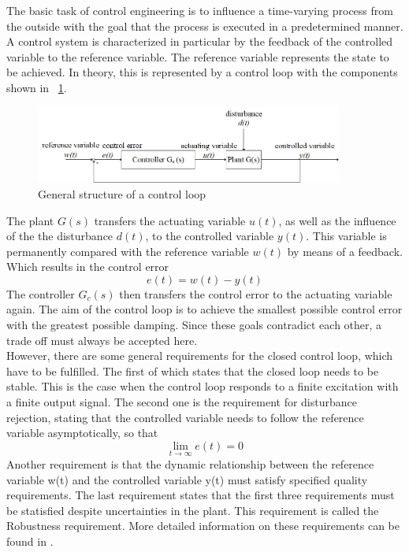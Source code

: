 The basic task of control engineering is to influence a time-varying process from the outside with the goal that the process is executed in a predetermined manner. A control system is characterized in particular by the feedback of the controlled variable to the reference variable. The reference variable represents the state to be achieved.
In theory, this is represented by a control loop with the components shown in \figurename~{\ref{fig:control_loop}}.
\begin{figure}
  \centering
  \includegraphics[width=0.9\textwidth]{images/control_loop.jpg}
  \caption[General structure of a control loop]{General structure of a control loop}
  \label{fig:control_loop}
\end{figure}
The plant $G(s)$ transfers the actuating variable $u(t)$, as well as the influence of the the disturbance $d(t)$, to the controlled variable $y(t)$. This variable is permanently compared with the reference variable $w(t)$ by means of a feedback. Which results in the control error
\begin{equation}
  e(t) = w(t) - y(t)
 \label{eq:e_t}
\end{equation}
The controller $G_{c}(s)$ then transfers the control error to the actuating variable again. The aim of the control loop is to achieve the smallest possible control error with the greatest possible damping. Since these goals contradict each other, a trade off must always be accepted here.\cite{Reg_17}
\\However, there are some general requirements for the closed control loop, which have to be fulfilled. The first of which states that the closed loop needs to be stable. This is the case when the control loop responds to a finite excitation with a finite output signal. The second one is the requirement for disturbance rejection, stating that the controlled variable needs to follow the reference variable asymptotically, so that
\begin{equation}
    \lim\limits_{t \rightarrow \infty}{e(t)} = 0
 \label{eq:lim_e}
\end{equation}
Another requirement is that the dynamic relationship between the reference variable w(t) and the controlled variable y(t) must satisfy specified quality requirements.  The last requirement states that the first three requirements must be statisfied despite uncertainties in the plant. This requirement is called the Robustness requirement. More detailed information on these requirements can be found in \cite{Reg_10}.
